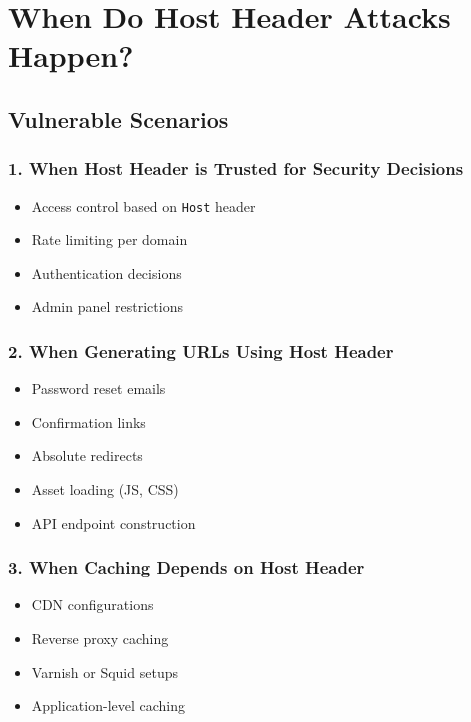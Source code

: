 \documentclass[12pt,a4paper]{article}
\begin{document}
\section{When Do Host Header Attacks Happen?}

\subsection{Vulnerable Scenarios}

\subsubsection{1. When Host Header is Trusted for Security Decisions}
\begin{itemize}
    \item Access control based on \texttt{Host} header
    \item Rate limiting per domain
    \item Authentication decisions
    \item Admin panel restrictions
\end{itemize}

\subsubsection{2. When Generating URLs Using Host Header}
\begin{itemize}
    \item Password reset emails
    \item Confirmation links
    \item Absolute redirects
    \item Asset loading (JS, CSS)
    \item API endpoint construction
\end{itemize}

\subsubsection{3. When Caching Depends on Host Header}
\begin{itemize}
    \item CDN configurations
    \item Reverse proxy caching
    \item Varnish or Squid setups
    \item Application-level caching
\end{itemize}
\end{document}
